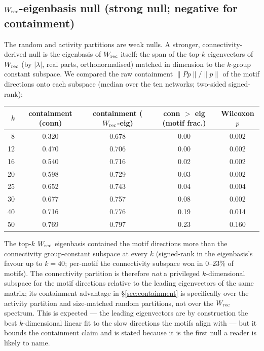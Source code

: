 \documentclass[11pt]{article}
\begin{document}
\subsection{$W_{\rm rec}$-eigenbasis null (strong null; negative for containment)}
\label{sec:wrec-null}
The random and activity partitions are weak nulls. A stronger, connectivity-derived null is the
eigenbasis of $W_{\rm rec}$ itself: the span of the top-$k$ eigenvectors of $W_{\rm rec}$ (by
$\lvert\lambda\rvert$, real parts, orthonormalised) matched in dimension to the $k$-group
constant subspace. We compared the raw containment $\lVert Pp\rVert/\lVert p\rVert$ of the motif
directions onto each subspace (median over the ten networks; two-sided signed-rank):
\begin{center}\small
\begin{tabular}{rcccc}
\toprule
$k$ & containment (conn) & containment ($W_{\rm rec}$-eig) & conn $>$ eig (motif frac.) & Wilcoxon $p$ \\
\midrule
8  & 0.320 & 0.678 & 0.00 & 0.002 \\
12 & 0.470 & 0.706 & 0.00 & 0.002 \\
16 & 0.540 & 0.716 & 0.02 & 0.002 \\
20 & 0.598 & 0.729 & 0.03 & 0.002 \\
25 & 0.652 & 0.743 & 0.04 & 0.004 \\
30 & 0.677 & 0.757 & 0.08 & 0.002 \\
40 & 0.716 & 0.776 & 0.19 & 0.014 \\
50 & 0.769 & 0.797 & 0.23 & 0.160 \\
\bottomrule
\end{tabular}
\end{center}
The top-$k$ $W_{\rm rec}$ eigenbasis contained the motif directions more than the connectivity
group-constant subspace at every $k$ (signed-rank in the eigenbasis's favour up to $k=40$;
per-motif the connectivity subspace won in $0$--$23\%$ of motifs). The connectivity partition is
therefore \emph{not} a privileged $k$-dimensional subspace for the motif directions relative to
the leading eigenvectors of the same matrix; its containment advantage in
\S\ref{sec:containment} is specifically over the activity partition and size-matched random
partitions, not over the $W_{\rm rec}$ spectrum. This is expected --- the leading eigenvectors
are by construction the best $k$-dimensional linear fit to the slow directions the motifs align
with --- but it bounds the containment claim and is stated because it is the first null a
reader is likely to name.
\end{document}
